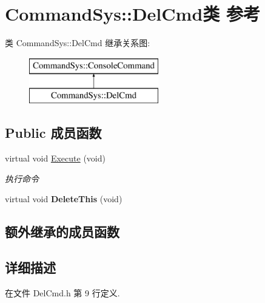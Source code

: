 \hypertarget{class_command_sys_1_1_del_cmd}{\section{Command\-Sys\-:\-:Del\-Cmd类 参考}
\label{class_command_sys_1_1_del_cmd}
}
类 Command\-Sys\-:\-:Del\-Cmd 继承关系图\-:\begin{figure}[H]
\begin{center}
\leavevmode
\includegraphics[height=2.000000cm]{class_command_sys_1_1_del_cmd}
\end{center}
\end{figure}
\subsection*{Public 成员函数}
\begin{DoxyCompactItemize}
\item 
virtual void \hyperlink{class_command_sys_1_1_del_cmd_a8b843ea865167bd3de7eef3f1902a463}{Execute} (void)
\begin{DoxyCompactList}\small\item\em 执行命令 \end{DoxyCompactList}\item 
\hypertarget{class_command_sys_1_1_del_cmd_a87a1da99fc98cd7c7439ee0d73fd5a5a}{virtual void {\bfseries Delete\-This} (void)}\label{class_command_sys_1_1_del_cmd_a87a1da99fc98cd7c7439ee0d73fd5a5a}

\end{DoxyCompactItemize}
\subsection*{额外继承的成员函数}


\subsection{详细描述}


在文件 Del\-Cmd.\-h 第 9 行定义.



